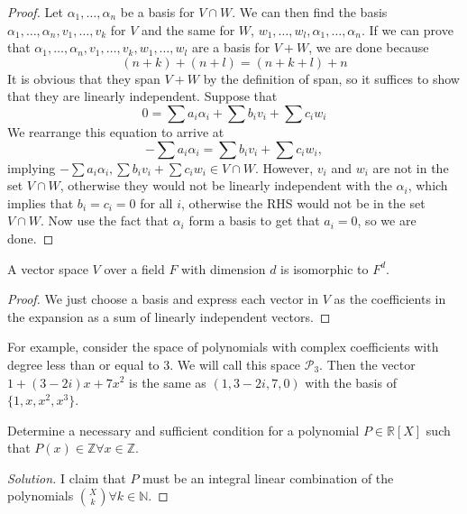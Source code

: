 \begin{proof}
Let $\alpha_1, \dots, \alpha_n$ be a basis for $V \cap W$. We can then
find the basis $\alpha_1, \dots, \alpha_n, v_1, \dots, v_k$ for $V$ and
the same for $W$, $w_1, \dots, w_l, \alpha_1, \dots, \alpha_n$. If we
can prove that $\alpha_1, \dots, \alpha_n, v_1, \dots, v_k, w_1, \dots,
w_l$ are a basis for $V + W$, we are done because
\[ (n + k) + (n + l) = (n + k + l) + n \]
It is obvious that they span $V + W$ by the definition of span, so it
suffices to show that they are linearly independent. Suppose that
\[ 0 = \sum a_i \alpha_i + \sum b_i v_i + \sum c_i w_i \]
We rearrange this equation to arrive at
\[ -\sum a_i \alpha_i = \sum b_i v_i + \sum c_i w_i, \]
implying $-\sum a_i \alpha_i, \sum b_i v_i + \sum c_i w_i \in V \cap W$.
However, $v_i$ and $w_i$ are not in the set $V \cap W$, otherwise they
would not be linearly independent with the $\alpha_i$, which implies
that $b_i = c_i = 0$ for all $i$, otherwise the RHS would not be in the
set $V \cap W$. Now use the fact that $\alpha_i$ form a basis to get
that $a_i = 0$, so we are done.
\end{proof}

\begin{prop}
A vector space $V$ over a field $F$ with dimension $d$ is isomorphic to
$F^d$.
\end{prop}

\begin{proof}
We just choose a basis and express each vector in $V$ as the
coefficients in the expansion as a sum of linearly independent vectors.
\end{proof}

For example, consider the space of polynomials with complex coefficients
with degree less than or equal to $3$. We will call this space
$\mathcal{P}_3$. Then the vector $1 + (3 - 2i)x + 7x^2$ is the same as
$(1, 3 - 2i, 7, 0)$ with the basis of $\lbrace 1, x, x^2, x^3 \rbrace$.

\begin{prb}
Determine a necessary and sufficient condition for a polynomial $P \in
\mathbb{R}[X]$ such that $P(x) \in \mathbb{Z} \forall x \in
\mathbb{Z}$.
\end{prb}

\begin{proof}[Solution]
I claim that $P$ must be an integral linear combination of the
polynomials $\binom{X}{k} \forall k \in \mathbb{N}$.
\end{proof}

